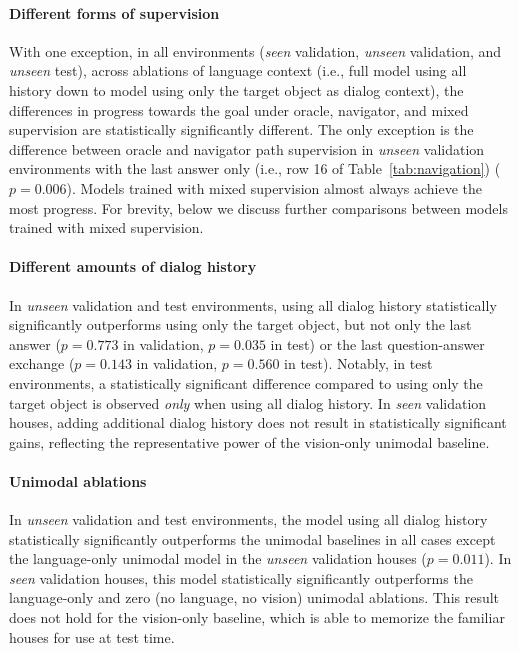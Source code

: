 \documentclass{article}
\begin{document}
\paragraph{Different forms of supervision}
With one exception, in all environments (\emph{seen} validation, \emph{unseen} validation, and \emph{unseen} test), across ablations of language context (i.e., full model using all history down to model using only the target object as dialog context), the differences in progress towards the goal under oracle, navigator, and mixed supervision are statistically significantly different.
The only exception is the difference between oracle and navigator path supervision in \emph{unseen} validation environments with the last answer only (i.e., row 16 of Table~\ref{tab:navigation}) ($p=0.006$).
Models trained with mixed supervision almost always achieve the most progress. For brevity, below we discuss further comparisons between models trained with mixed supervision.

\paragraph{Different amounts of dialog history}
In \emph{unseen} validation and test environments, using all dialog history statistically significantly outperforms using only the target object, but not only the last answer ($p=0.773$ in validation, $p=0.035$ in test) or the last question-answer exchange ($p=0.143$ in validation, $p=0.560$ in test).
Notably, in test environments, a statistically significant difference compared to using only the target object is observed \emph{only} when using all dialog history.
In \emph{seen} validation houses, adding additional dialog history does not result in statistically significant gains, reflecting the representative power of the vision-only unimodal baseline.

\paragraph{Unimodal ablations}
In \emph{unseen} validation and test environments, the model using all dialog history statistically significantly outperforms the unimodal baselines in all cases except the language-only unimodal model in the \emph{unseen} validation houses ($p=0.011$).
In \emph{seen} validation houses, this model statistically significantly outperforms the language-only and zero (no language, no vision) unimodal ablations.
This result does not hold for the vision-only baseline, which is able to memorize the familiar houses for use at test time.
\end{document}

